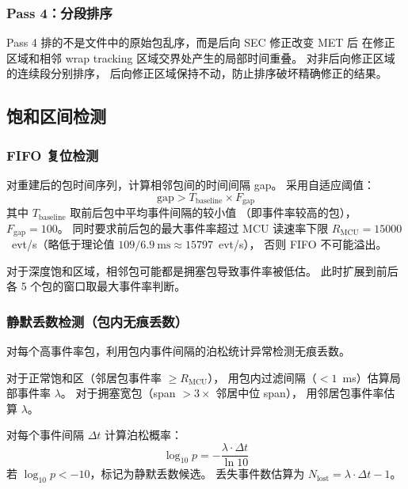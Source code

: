 \documentclass[aps,prd,twocolumn,nofootinbib,superscriptaddress]{revtex4-2}
\begin{document}
\subsubsection{Pass 4：分段排序}

Pass 4 排的不是文件中的原始包乱序，而是后向 SEC 修正改变 MET 后
在修正区域和相邻 wrap tracking 区域交界处产生的局部时间重叠。
对非后向修正区域的连续段分别排序，
后向修正区域保持不动，防止排序破坏精确修正的结果。

\subsection{饱和区间检测}\label{sec:detection}

\subsubsection{FIFO 复位检测}

对重建后的包时间序列，计算相邻包间的时间间隔 gap。
采用自适应阈值：
\begin{equation}\label{eq:gap}
  \mathrm{gap} > T_\mathrm{baseline} \times F_\mathrm{gap}
\end{equation}
其中 $T_\mathrm{baseline}$ 取前后包中平均事件间隔的较小值
（即事件率较高的包），$F_\mathrm{gap} = 100$。
同时要求前后包的最大事件率超过 MCU 读速率下限
$R_\mathrm{MCU} = 15000$~evt/s（略低于理论值 $109/6.9~\text{ms} \approx 15797$~evt/s），
否则 FIFO 不可能溢出。

对于深度饱和区域，相邻包可能都是拥塞包导致事件率被低估。
此时扩展到前后各 5 个包的窗口取最大事件率判断。

\subsubsection{静默丢数检测（包内无痕丢数）}

对每个高事件率包，利用包内事件间隔的泊松统计异常检测无痕丢数。

对于正常饱和区（邻居包事件率 $\geq R_\mathrm{MCU}$），
用包内过滤间隔（$< 1$~ms）估算局部事件率 $\lambda$。
对于拥塞宽包（span $> 3 \times$ 邻居中位 span），
用邻居包事件率估算 $\lambda$。

对每个事件间隔 $\Delta t$ 计算泊松概率：
\begin{equation}\label{eq:poisson}
  \log_{10} p = -\frac{\lambda \cdot \Delta t}{\ln 10}
\end{equation}
若 $\log_{10} p < -10$，标记为静默丢数候选。
丢失事件数估算为 $N_\mathrm{lost} = \lambda \cdot \Delta t - 1$。
\end{document}
